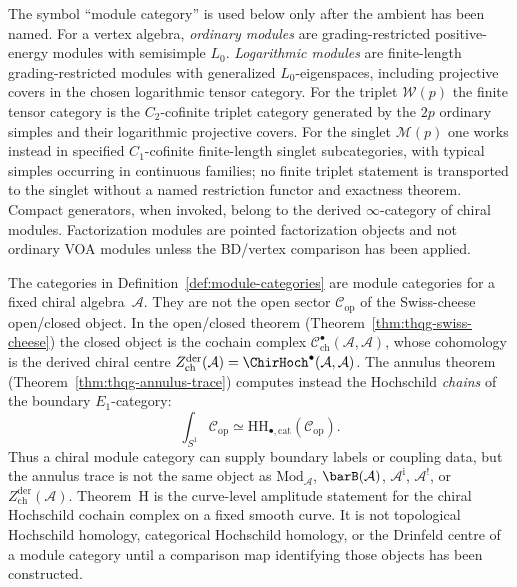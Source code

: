 \begin{remark}
\label{rem:module-category-ambient-firewall}
The symbol ``module category'' is used below only after the ambient has
been named. For a vertex algebra, \emph{ordinary modules} are
grading-restricted positive-energy modules with semisimple $L_0$.
\emph{Logarithmic modules} are finite-length grading-restricted
modules with generalized $L_0$-eigenspaces, including projective
covers in the chosen logarithmic tensor category. For the triplet
$\mathcal W(p)$ the finite tensor category is the
$C_2$-cofinite triplet category generated by the $2p$ ordinary simples
and their logarithmic projective covers. For the singlet
$\mathcal M(p)$ one works instead in specified $C_1$-cofinite
finite-length singlet subcategories, with typical simples occurring in
continuous families; no finite triplet statement is transported to the
singlet without a named restriction functor and exactness theorem.
Compact generators, when invoked, belong to the derived
$\infty$-category of chiral modules. Factorization modules are pointed
factorization objects and not ordinary VOA modules unless the
BD/vertex comparison has been applied.
\end{remark}

\begin{remark}
\label{rem:module-open-sector-firewall}
The categories in Definition~\ref{def:module-categories} are module
categories for a fixed chiral algebra~$\mathcal A$. They are not the
open sector $\mathcal C_{\mathrm{op}}$ of the Swiss-cheese
open/closed object. In the open/closed theorem
\textup{(}Theorem~\textup{\ref{thm:thqg-swiss-cheese}}\textup{)}
the closed object is the cochain complex
$\mathcal C^\bullet_{\mathrm{ch}}(\mathcal A,\mathcal A)$, whose
cohomology is the derived chiral centre
$Z^{\mathrm{der}}_{\mathrm{ch}}(\mathcal A)
=\ChirHoch^\bullet(\mathcal A,\mathcal A)$. The annulus theorem
\textup{(}Theorem~\textup{\ref{thm:thqg-annulus-trace}}\textup{)}
computes instead the Hochschild \emph{chains} of the boundary
$E_1$-category:
\[
\int_{S^1}\mathcal C_{\mathrm{op}}
\simeq
\mathrm{HH}_{\bullet,\mathrm{cat}}(\mathcal C_{\mathrm{op}}).
\]
Thus a chiral module category can supply boundary labels or coupling
data, but the annulus trace is not the same object as
$\mathrm{Mod}_{\mathcal A}$, $\barB(\mathcal A)$,
$\mathcal A^{\mathrm i}$, $\mathcal A^!$, or
$Z^{\mathrm{der}}_{\mathrm{ch}}(\mathcal A)$. Theorem~H is the
curve-level amplitude statement for the chiral Hochschild cochain
complex on a fixed smooth curve. It is not topological Hochschild
homology, categorical Hochschild homology, or the Drinfeld centre of a
module category until a comparison map identifying those objects has
been constructed.
\end{remark}

